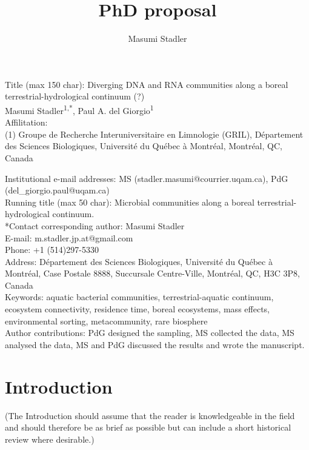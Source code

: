 \documentclass[12pt,a4paper]{article} %
\author{Masumi Stadler}
\title{PhD proposal}
\begin{document}

\setlength{\parindent}{0cm}
Title (max 150 char): Diverging DNA and RNA communities along a boreal terrestrial-hydrological continuum (?) \\

Masumi Stadler\textsuperscript{1,*}, Paul A. del Giorgio\textsuperscript{1}\\

Affilitation:\\
(1) Groupe de Recherche Interuniversitaire en Limnologie (GRIL), Département des Sciences Biologiques, Université du Québec à Montréal, Montréal, QC, Canada


Institutional e-mail addresses: MS (stadler.masumi@courrier.uqam.ca), PdG (del\_giorgio.paul@uqam.ca)\\

Running title (max 50 char): Microbial communities along a boreal terrestrial-hydrological continuum.\\

*Contact corresponding author: Masumi Stadler \\
E-mail: m.stadler.jp.at@gmail.com \\
Phone: +1 (514)297-5330 \\
Address: Département des Sciences Biologiques, Université du Québec à Montréal, Case Postale 8888, Succursale Centre-Ville, Montréal, QC, H3C 3P8, Canada \\

Keywords: aquatic bacterial communities, terrestrial-aquatic continuum, ecosystem connectivity, residence time, boreal ecosystems, mass effects, environmental sorting, metacommunity, rare biosphere\\

Author contributions: PdG designed the sampling, MS collected the data, MS analysed the data, MS and PdG discussed the results and wrote the manuscript.\\

\newpage

\doublespacing





\setlength{\parindent}{1cm}
\section*{Introduction}
(The Introduction should assume that the reader is knowledgeable in the field and should therefore be as brief as possible but can include a short historical review where desirable.)
\end{document}
